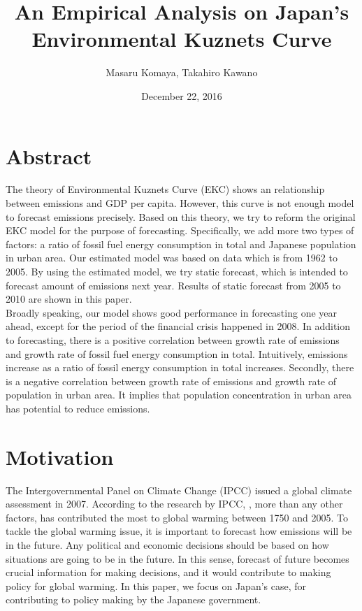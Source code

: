 \documentclass[12pt, a4paper]{article}
\title{An Empirical Analysis on Japan's Environmental Kuznets Curve}
\author{Masaru Komaya, Takahiro Kawano}
\date{December 22, 2016}
\begin{document}
\maketitle
\newpage
\tableofcontents
\newpage
\section{Abstract}
The theory of Environmental Kuznets Curve (EKC) shows an relationship between  emissions and GDP per capita. However, this curve is not enough model to forecast  emissions precisely. Based on this theory, we try to reform the original EKC model for the purpose of forecasting. Specifically, we add more two types of factors: a ratio of fossil fuel energy consumption in total and Japanese population in urban area. Our estimated model was based on data which is from 1962 to 2005. By using the estimated model, we try static forecast, which is intended to forecast amount of  emissions next year. Results of static forecast from 2005 to 2010 are shown in this paper. \\
Broadly speaking, our model shows good performance in forecasting one year ahead, except for the period of the financial crisis happened in 2008. In addition to forecasting, there is a positive correlation between growth rate of  emissions and growth rate of fossil fuel energy consumption in total. Intuitively,  emissions increase as a ratio of fossil energy consumption in total increases. Secondly, there is a negative correlation between growth rate of  emissions and growth rate of population in urban area. It implies that population concentration in urban area has potential to reduce  emissions. 
\newpage

\section{Motivation}
 The Intergovernmental Panel on Climate Change (IPCC) issued a global climate assessment in 2007. According to the research by IPCC, , more than any other factors, has contributed the most to global warming between 1750 and 2005. To tackle the global warming issue, it is important to forecast how  emissions will be in the future. Any political and economic decisions should be based on how situations are going to be in the future. In this sense, forecast of future  becomes crucial information for making decisions, and it would contribute to making policy for global warming. In this paper, we focus on Japan’s case, for contributing to policy making by the Japanese government.  
\end{document}
